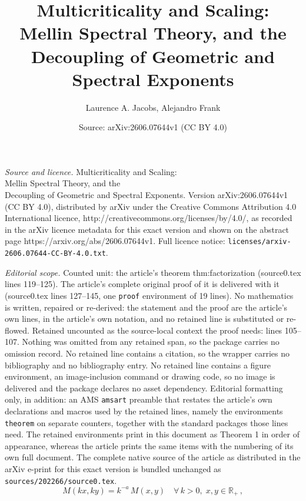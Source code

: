 \documentclass[10pt,a4paper]{amsart}
\title{Multicriticality and Scaling:\\ Mellin Spectral Theory, and the\\ Decoupling of Geometric and Spectral Exponents}
\author{Laurence A. Jacobs, Alejandro Frank}
\date{Source: arXiv:2606.07644v1 (CC BY 4.0)}
\begin{document}
\maketitle

\noindent\emph{Source and licence.} Multicriticality and Scaling:\\ Mellin Spectral Theory, and the\\ Decoupling of Geometric and Spectral Exponents. Version arXiv:2606.07644v1 (CC BY 4.0), distributed by arXiv under the Creative Commons Attribution 4.0 International licence, http://creativecommons.org/licenses/by/4.0/, as recorded in the arXiv licence metadata for this exact version and shown on the abstract page https://arxiv.org/abs/2606.07644v1. Full licence notice: \texttt{licenses/arxiv-2606.07644-CC-BY-4.0.txt}.\par\smallskip

\noindent\textit{Editorial scope.} Counted unit: the article's theorem thm:factorization (source0.tex lines 119--125). The article's complete original proof of it is delivered with it (source0.tex lines 127--145, one \texttt{proof} environment of 19 lines). No mathematics is written, repaired or re-derived: the statement and the proof are the article's own lines, in the article's own notation, and no retained line is substituted or re-flowed.  Retained uncounted as the source-local context the proof needs: lines 105--107.  Nothing was omitted from any retained span, so the package carries no omission record.  No retained line contains a citation, so the wrapper carries no bibliography and no bibliography entry.  No retained line contains a figure environment, an image-inclusion command or drawing code, so no image is delivered and the package declares no asset dependency.  Editorial formatting only, in addition: an AMS \texttt{amsart} preamble that restates the article's own declarations and macros used by the retained lines, namely the environments \texttt{theorem} on separate counters, together with the standard packages those lines need.  The retained environments print in this document as Theorem 1 in order of appearance, whereas the article prints the same items with the numbering of its own full document.  The complete native source of the article as distributed in the arXiv e-print for this exact version is bundled unchanged as \texttt{sources/202266/source0.tex}.
\begin{equation}\label{eq:scaleinv}
M(kx,ky) = k^{-a}\, M(x,y) \quad \forall\, k > 0,\; x,y \in \mathbb{R}_+\,,
\end{equation}
\end{document}
